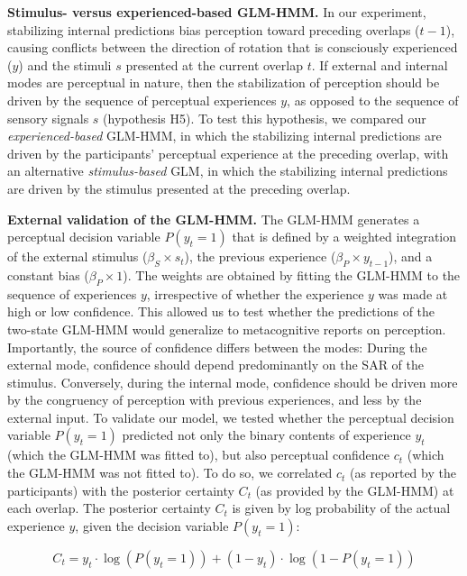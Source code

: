 \documentclass[
]{article}
\begin{document}
\textbf{Stimulus- versus experienced-based GLM-HMM.} In our experiment,
stabilizing internal predictions bias perception toward preceding
overlaps (\(t-1\)), causing conflicts between the direction of rotation
that is consciously experienced (\(y\)) and the stimuli \(s\) presented
at the current overlap \(t\). If external and internal modes are
perceptual in nature, then the stabilization of perception should be
driven by the sequence of perceptual experiences \(y\), as opposed to
the sequence of sensory signals \(s\) (hypothesis H5). To test this
hypothesis, we compared our \emph{experienced-based} GLM-HMM, in which
the stabilizing internal predictions are driven by the participants'
perceptual experience at the preceding overlap, with an alternative
\emph{stimulus-based} GLM, in which the stabilizing internal predictions
are driven by the stimulus presented at the preceding overlap.

\textbf{External validation of the GLM-HMM.} The GLM-HMM generates a
perceptual decision variable \(P(y_t = 1)\) that is defined by a
weighted integration of the external stimulus (\(\beta_S \times s_t\)),
the previous experience (\(\beta_P \times y_{t-1}\)), and a constant
bias (\(\beta_P \times 1\)). The weights are obtained by fitting the
GLM-HMM to the sequence of experiences \(y\), irrespective of whether
the experience \(y\) was made at high or low confidence. This allowed us
to test whether the predictions of the two-state GLM-HMM would
generalize to metacognitive reports on perception. Importantly, the
source of confidence differs between the modes: During the external
mode, confidence should depend predominantly on the SAR of the stimulus.
Conversely, during the internal mode, confidence should be driven more
by the congruency of perception with previous experiences, and less by
the external input. To validate our model, we tested whether the
perceptual decision variable \(P(y_t = 1)\) predicted not only the
binary contents of experience \(y_t\) (which the GLM-HMM was fitted to),
but also perceptual confidence \(c_t\) (which the GLM-HMM was not fitted
to). To do so, we correlated \(c_t\) (as reported by the participants)
with the posterior certainty \(C_t\) (as provided by the GLM-HMM) at
each overlap. The posterior certainty \(C_t\) is given by log
probability of the actual experience \(y\), given the decision variable
\(P(y_t = 1)\):

\[
C_t = y_t \cdot \log(P(y_t = 1)) + (1 - y_t) \cdot \log(1 - P(y_t = 1)) 
\]
\end{document}
